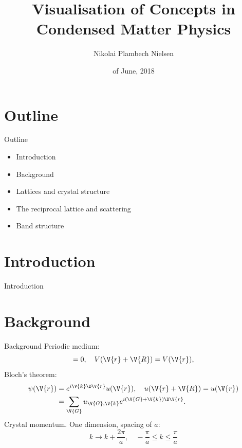 \documentclass{beamer}
\title{Visualisation of Concepts in Condensed Matter Physics}
\author{Nikolai Plambech Nielsen}
\institute{Niels Bohr Institute}
\date{\nth{27} of June, 2018}
\begin{document}
\begin{frame}
  \titlepage
\end{frame}


\section{Outline}
\begin{frame}{Outline}
\begin{itemize}
  \item Introduction
  \item Background
  \item Lattices and crystal structure
  \item The reciprocal lattice and scattering
  \item Band structure
\end{itemize}
\end{frame}



\section{Introduction}
\begin{frame}{Introduction}
\end{frame}


\section{Background}
\begin{frame}{Background}
Periodic medium:
\begin{equation*}
	[\op{T}_{\V{R}}, \op{H}]=0, \quad  V(\V{r}+\V{R}) = V(\V{r}),
\end{equation*}
Bloch's theorem:
\begin{align*}
	\psi(\V{r}) &= e^{i \V{k}\D \V{r}} u(\V{r}), \quad u(\V{r}+\V{R}) = u(\V{r}) \\
	&= \sum_{\V{G}} u_{\V{G},\V{k}} e^{i (\V{G}+\V{k}) \D \V{r}}.
\end{align*}
Crystal momentum. One dimension, spacing of $ a $:
\begin{equation*}
	k \to k+\frac{2\pi}{a}, \quad -\frac{\pi}{a} \leq k \leq \frac{\pi}{a}
\end{equation*}
\end{frame}
\end{document}
